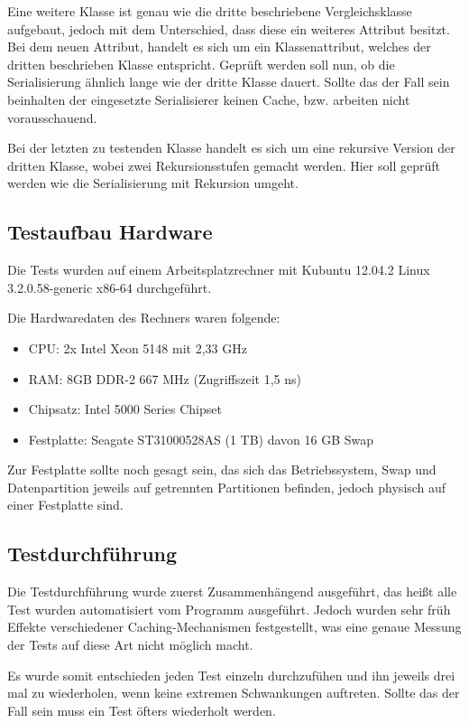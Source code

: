 Eine weitere Klasse ist genau wie die dritte beschriebene Vergleichsklasse aufgebaut, jedoch mit dem Unterschied, dass diese ein weiteres Attribut besitzt. Bei dem neuen Attribut, handelt es sich um ein Klassenattribut, welches der dritten beschrieben Klasse entspricht.
Gepr\"uft werden soll nun, ob die Serialisierung \"ahnlich lange wie der dritte Klasse dauert. Sollte das der Fall sein beinhalten der eingesetzte Serialisierer keinen Cache, bzw. arbeiten nicht vorausschauend.

Bei der letzten zu testenden Klasse handelt es sich um eine rekursive Version der dritten Klasse, wobei zwei Rekursionsstufen gemacht werden. Hier soll gepr\"uft werden wie die Serialisierung mit Rekursion umgeht.

\newpage
\subsection{Testaufbau Hardware}
Die Tests wurden auf einem Arbeitsplatzrechner mit Kubuntu 12.04.2 Linux 3.2.0.58-generic x86-64 durchgef\"uhrt.

Die Hardwaredaten des Rechners waren folgende:
\begin{itemize}
 \item CPU: 2x Intel Xeon 5148 mit 2,33 GHz
 \item RAM: 8GB DDR-2 667 MHz (Zugriffszeit 1,5 ns)
 \item Chipsatz: Intel 5000 Series Chipset
 \item Festplatte: Seagate ST31000528AS (1 TB) davon 16 GB Swap
\end{itemize}
Zur Festplatte sollte noch gesagt sein, das sich das Betriebssystem, Swap und Datenpartition jeweils auf getrennten Partitionen befinden, jedoch physisch auf einer Festplatte sind.

\subsection{Testdurchf\"uhrung}
Die Testdurchf\"uhrung wurde zuerst Zusammenh\"angend ausgef\"uhrt, das hei\ss{}t alle Test wurden automatisiert vom Programm ausgef\"uhrt. Jedoch wurden sehr fr\"uh Effekte verschiedener Caching-Mechanismen festgestellt, was eine genaue Messung der Tests auf diese Art nicht m\"oglich macht. 

Es wurde somit entschieden jeden Test einzeln durchzuf\"uhen und ihn jeweils drei mal zu wiederholen, wenn keine extremen Schwankungen auftreten. Sollte das der Fall sein muss ein Test \"ofters wiederholt werden.

